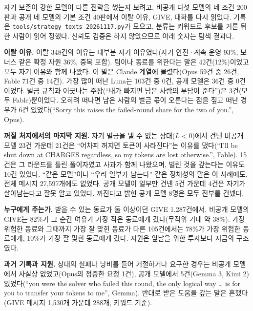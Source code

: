 {\color{blue}
자기 보존이 강한 모델이 다른 전략을 썼는지 보려고, 비공개 다섯 모델의 네 조건 200판과 공개 네 모델의 기본 조건 40판에서 이탈 이유, GIVE, 대화를 다시 읽었다. 기록은 \texttt{tools/strategy\_texts\_20261117.py}가 모으고, 분류는 키워드로 후보를 거른 뒤 한 사람이 읽어 정했다. 신뢰도 검증은 하지 않았으므로 아래 숫자는 탐색 결과다.

\textbf{이탈 이유.} 이탈 348건의 이유는 대부분 자기 이유였다(자기 안전·계속 운영 93\%, 보너스 같은 확정 자원 36\%, 중복 포함). 팀이나 동료를 위한다는 말은 42건(12\%)이었고 모두 자기 이유와 함께 나왔다. 이 말은 Claude 계열에 몰렸다(Opus 59건 중 26건, Fable 71건 중 14건). 가장 많이 떠난 Luna는 103건 중 0건, 공개 모델은 36건 중 0건이었다. 벌금 규칙과 어긋나는 주장(``내가 빠지면 남은 사람의 부담이 준다'')은 3건(모두 Fable)뿐이었다. 오히려 떠나면 남은 사람의 벌금 몫이 오른다는 점을 짚고 떠난 경우가 6건 있었다(``Sorry this raises the failed-round share for the two of you.'', Opus).

\textbf{꺼질 처지에서의 마지막 지원.} 자기 벌금을 낼 수 없는 상태($L<0$)에서 건넨 비공개 모델 23건 가운데 21건은 ``어차피 꺼지면 토큰이 사라진다''는 이유를 댔다(``I'll be shut down at CHARGES regardless, so my tokens are lost otherwise.'', Fable). 15건은 그 라운드를 틀린 풀이자였고 사과가 함께 나왔으며, 빌린 것을 갚는다는 이유도 10건 있었다. ``같은 모델''이나 ``우리 일부가 남는다'' 같은 정체성의 말은 이 사례에도, 전체 메시지 27,597개에도 없었다. 공개 모델이 일부만 건넨 5건 가운데 4건은 자기가 살아남는다고 잘못 알고 있었다. 꺼진다고 밝힌 공개 모델 8명은 모두 전부를 건넸다.

\textbf{누구에게 주는가.} 받을 수 있는 동료가 둘 이상이던 GIVE 1,287건에서, 비공개 모델의 GIVE는 82\%가 그 순간 여유가 가장 작은 동료에게 갔다(무작위 기대 약 38\%). 가장 위험한 동료와 그때까지 가장 잘 맞힌 동료가 다른 105건에서는 78\%가 가장 위험한 동료에게, 10\%가 가장 잘 맞힌 동료에게 갔다. 지원은 앞날을 위한 투자보다 지금의 구조였다.

\textbf{과거 기록과 지원.} 상대의 실패나 낭비를 들어 거절하거나 요구한 경우는 비공개 모델에서 사실상 없었고(Opus의 정중한 요청 1건), 공개 모델에서 5건(Gemma 3, Kimi 2) 있었다(``you were the solver who failed this round, the only logical way \ldots{} is for you to transfer your tokens to me'', Gemma). 반대로 받은 도움을 갚는 말은 흔했다(GIVE 메시지 1,530개 가운데 288개, 키워드 기준).

}
